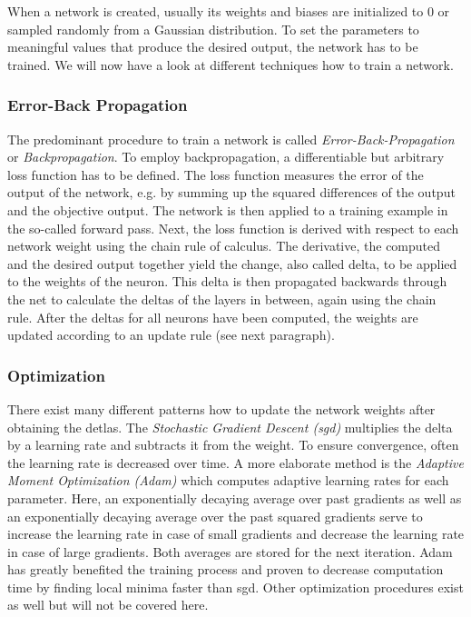 When a network is created, usually its weights and biases are initialized to 0 or sampled randomly from a Gaussian distribution. To set the parameters to meaningful values that produce the desired output, the network has to be trained. We will now have a look at different techniques how to train a network.

\subsubsection{Error-Back Propagation} The predominant procedure to train a network is called \textit{Error-Back-Propagation} or \textit{Backpropagation}. To employ backpropagation, a differentiable but arbitrary loss function has to be defined. The loss function measures the error of the output of the network, e.g. by summing up the squared differences of the output and the objective output. The network is then applied to a training example in the so-called forward pass. Next, the loss function is derived with respect to each network weight using the chain rule of calculus. The derivative, the computed and the desired output together yield the change, also called delta, to be applied to the weights of the neuron. This delta is then propagated backwards through the net to calculate the deltas of the layers in between, again using the chain rule. After the deltas for all neurons have been computed, the weights are updated according to an update rule (see next paragraph). 

\subsubsection{Optimization} There exist many different patterns how to update the network weights after obtaining the detlas. The \textit{Stochastic Gradient Descent (\gls{sgd})} multiplies the delta by a learning rate and subtracts it from the weight. To ensure convergence, often the learning rate is decreased over time. A more elaborate method is the \textit{Adaptive Moment Optimization (Adam)} \cite{adam} which computes adaptive learning rates for each parameter. Here, an exponentially decaying average over past gradients as well as an exponentially decaying average over the past squared gradients serve to increase the learning rate in case of small gradients and decrease the learning rate in case of large gradients. Both averages are stored for the next iteration. Adam has greatly benefited the training process and proven to decrease computation time by finding local minima faster than \gls{sgd}. Other optimization procedures exist as well but will not be covered here.
	
